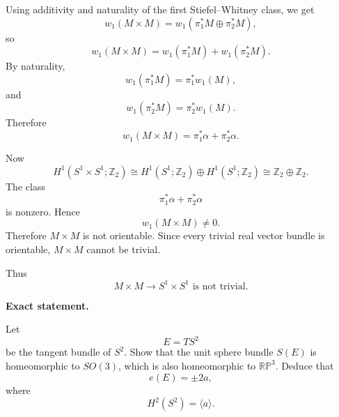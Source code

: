 \begin{solution}
	Using additivity and naturality of the first Stiefel--Whitney class, we get
	\[
	w_{1}(M\times M)
	=
	w_{1}(\pi_{1}^{*}M\oplus \pi_{2}^{*}M),
	\]
	so
	\[
	w_{1}(M\times M)
	=
	w_{1}(\pi_{1}^{*}M)+w_{1}(\pi_{2}^{*}M).
	\]
	By naturality,
	\[
	w_{1}(\pi_{1}^{*}M)=\pi_{1}^{*}w_{1}(M),
	\]
	and
	\[
	w_{1}(\pi_{2}^{*}M)=\pi_{2}^{*}w_{1}(M).
	\]
	Therefore
	\[
	w_{1}(M\times M)
	=
	\pi_{1}^{*}\alpha+\pi_{2}^{*}\alpha.
	\]

	Now
	\[
	H^{1}(S^{1}\times S^{1};\mathbb Z_{2})
	\cong
	H^{1}(S^{1};\mathbb Z_{2})\oplus H^{1}(S^{1};\mathbb Z_{2})
	\cong
	\mathbb Z_{2}\oplus \mathbb Z_{2}.
	\]
	The class
	\[
	\pi_{1}^{*}\alpha+\pi_{2}^{*}\alpha
	\]
	is nonzero. Hence
	\[
	w_{1}(M\times M)\neq 0.
	\]
	Therefore \(M\times M\) is not orientable. Since every trivial real vector bundle is orientable, \(M\times M\) cannot be trivial.

	Thus
	\[
	\boxed{M\times M\to S^{1}\times S^{1}\text{ is not trivial}.}
	\]
\end{solution}

\begin{problem}

\medskip
\noindent\textbf{Exact statement.}\par
\smallskip

	Let
	\[
	E=TS^{2}
	\]
	be the tangent bundle of \(S^{2}\). Show that the unit sphere bundle \(S(E)\) is homeomorphic to \(SO(3)\), which is also homeomorphic to \(\mathbb{RP}^{3}\). Deduce that
	\[
	e(E)=\pm 2a,
	\]
	where
	\[
	H^{2}(S^{2})=\langle a\rangle.
	\]
\end{problem}

